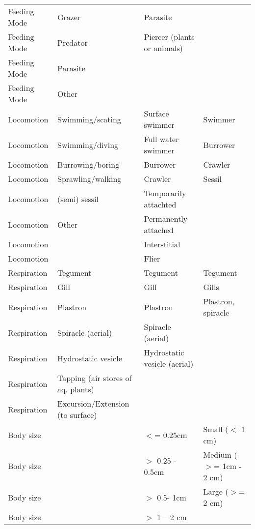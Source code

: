 \documentclass[../Draft_harmonization_paper.tex]{subfiles}
\begin{document}
\begin{longtable}{llll}
    Feeding Mode & Grazer & Parasite &  \\ 
    Feeding Mode & Predator & \color{cyan}Piercer (plants or animals) &  \\ 
    Feeding Mode & Parasite &  &  \\ 
    \color{cyan}Feeding Mode & \color{cyan}Other &  &  \\ 
    \hline
    \rowcolor{green!25}
    Locomotion & Swimming/scating & Surface swimmer & Swimmer \\ 
    \cellcolor{green!25}Locomotion & \cellcolor{green!25}Swimming/diving & \cellcolor{green!25}Full water swimmer & Burrower \\ 
    Locomotion & Burrowing/boring & Burrower & Crawler \\ 
    Locomotion & Sprawling/walking & Crawler & \cellcolor{green!50}Sessil \\ 
    \cellcolor{green!50}Locomotion & \cellcolor{green!50}(semi) sessil & \cellcolor{green!50}Temporarily attachted &  \\ 
    \color{cyan}Locomotion & \color{cyan}Other & \cellcolor{green!50}Permanently attached &  \\ 
    \color{cyan}Locomotion &  & \color{cyan}Interstitial &  \\ 
    \color{cyan}Locomotion &  & \color{cyan}Flier &  \\
    \hline
    Respiration & Tegument & Tegument & Tegument \\ 
    Respiration & Gill & Gill & Gills \\ 
    \rowcolor{orange!25}
    Respiration & Plastron & Plastron & Plastron, spiracle \\ 
    \cellcolor{orange!25}Respiration & \cellcolor{orange!25}Spiracle (aerial) & \cellcolor{orange!25}Spiracle (aerial) &  \\ 
    \color{cyan}Respiration & \color{cyan}Hydrostatic vesicle & \color{cyan}Hydrostatic vesicle (aerial) &  \\ 
    \color{cyan}Respiration & \color{cyan}Tapping (air stores of aq. plants) &  &  \\ 
    \color{cyan}Respiration & \color{cyan}Excursion/Extension (to surface) &  &  \\ 
    \hline
    Body size &  & $<$= 0.25cm & Small ($<$ 1 cm) \\ 
    Body size &  & $>$ 0.25 - 0.5cm & Medium ($>$= 1cm - 2 cm) \\ 
    Body size &  & $>$ 0.5- 1cm & Large ($>$= 2 cm) \\ 
    Body size &  & $>$ 1 – 2 cm &  \\ 

\end{longtable}
\end{document}
